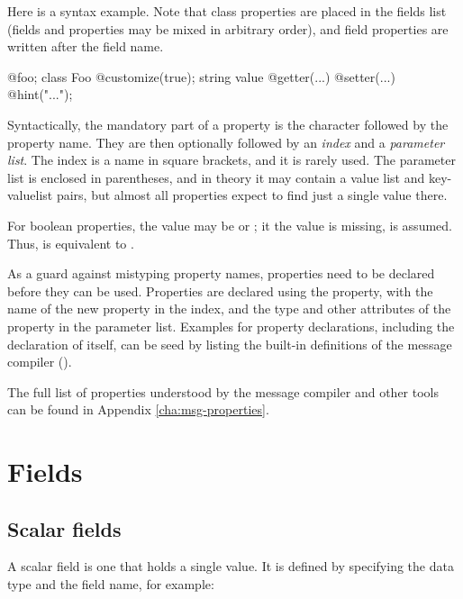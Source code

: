 Here is a syntax example. Note that class properties are placed in the fields
list (fields and properties may be mixed in arbitrary order), and field
properties are written after the field name.

\begin{msg}
@foo;
class Foo {
  @customize(true);
  string value @getter(...) @setter(...) @hint("...");
}
\end{msg}

Syntactically, the mandatory part of a property is the  character
followed by the property name. They are then optionally followed by an
\textit{index} and a \textit{parameter list}. The index is a name in square
brackets, and it is rarely used. The parameter list is enclosed in parentheses,
and in theory it may contain a value list and key-valuelist pairs, but
almost all properties expect to find just a single value there.

For boolean properties, the value may be  or ; it the value
is missing,  is assumed. Thus,  is equivalent to
.

As a guard against mistyping property names, properties need to be declared
before they can be used. Properties are declared using the 
property, with the name of the new property in the index, and the type and other
attributes of the property in the parameter list. Examples for property
declarations, including the declaration of  itself, can be seed
by listing the built-in definitions of the message compiler
().

The full list of properties understood by the message compiler and other {\opp}
tools can be found in Appendix \ref{cha:msg-properties}.



\section{Fields}
\label{sec:msg-defs:fields}

\subsection{Scalar fields}
\label{sec:msg-defs:scalar-fields}

A scalar field is one that holds a single value. It is defined by specifying the
data type and the field name, for example:

